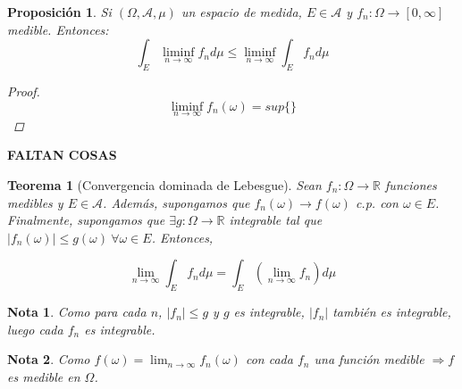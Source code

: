 \documentclass[11pt, a4paper]{article}
\newcommand{\R}{\mathbb{R}}
\theoremstyle{theorem-style}
\newtheorem{nth}{Teorema}[section]
\newtheorem{nprop}{Proposición}[section]
\theoremstyle{definition-style}
\theoremstyle{remark-style}
\newtheorem*{nota}{Nota}
\theoremstyle{example-style}
\begin{document}
\begin{nprop}
  Si $(\Omega,\mathcal{A},\mu)$ un espacio de medida, $E\in \mathcal{A}$ y $f_n:\Omega \to [0,\infty]$ medible. Entonces:
  \[
    \int_E \liminf_{n \to \infty} f_n d\mu \leq \liminf_{n\to \infty} \int_E f_n d\mu
  \]
  \begin{proof}\hfill \\
    \[
      \liminf_{n\to \infty} f_n(\omega) = sup\{\}	
    \]
    
  \end{proof}
\end{nprop}

\textbf{FALTAN COSAS}



\begin{nth}[Convergencia dominada de Lebesgue]
  Sean $f_n : \Omega \rightarrow \R$ funciones medibles y $E \in \mathcal{A}$. Además, supongamos que ${f_n(\omega)} \rightarrow f(\omega)$ c.p. con $\omega \in E$. Finalmente, supongamos que $\exists g: \Omega \rightarrow \R$ integrable tal que $|f_n(\omega)| \leq g(\omega) \ \forall \omega \in E$. Entonces,
  
  $$ \lim_{n \to \infty} \int_E f_n d \mu = \int_E  \left( \lim_{n \to \infty} f_n \right) d \mu$$ 
\end{nth}

\begin{nota}
  Como para cada $n$, $|f_n| \leq g$ y $g$ es integrable, $|f_n|$ también es integrable, luego cada $f_n$ es integrable.
\end{nota}

\begin{nota}
  Como $f(\omega) = \lim_{n \to \infty} f_n(\omega)$ con cada $f_n$ una función medible $\Rightarrow f$ es medible en $\Omega$.
\end{nota}
\end{document}

